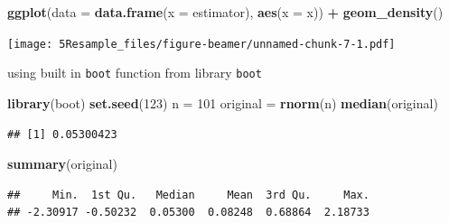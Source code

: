 \documentclass[10pt,ignorenonframetext,]{beamer}
\newenvironment{Shaded}{\begin{snugshade}}{\end{snugshade}}
\newcommand{\KeywordTok}[1]{\textcolor[rgb]{0.13,0.29,0.53}{\textbf{#1}}}
\newcommand{\DataTypeTok}[1]{\textcolor[rgb]{0.13,0.29,0.53}{#1}}
\newcommand{\DecValTok}[1]{\textcolor[rgb]{0.00,0.00,0.81}{#1}}
\newcommand{\StringTok}[1]{\textcolor[rgb]{0.31,0.60,0.02}{#1}}
\newcommand{\OperatorTok}[1]{\textcolor[rgb]{0.81,0.36,0.00}{\textbf{#1}}}
\newcommand{\NormalTok}[1]{#1}
\begin{document}
\begin{frame}[fragile]

\begin{Shaded}
\begin{Highlighting}[]
\KeywordTok{ggplot}\NormalTok{(}\DataTypeTok{data =} \KeywordTok{data.frame}\NormalTok{(}\DataTypeTok{x =}\NormalTok{ estimator), }\KeywordTok{aes}\NormalTok{(}\DataTypeTok{x =}\NormalTok{ x)) }\OperatorTok{+}\StringTok{ }\KeywordTok{geom_density}\NormalTok{()}
\end{Highlighting}
\end{Shaded}

\texttt{[image: 5Resample\_files/figure-beamer/unnamed-chunk-7-1.pdf]}

\end{frame}

\begin{frame}[fragile]

\begin{block}{using built in \texttt{boot} function from library
\texttt{boot}}

\begin{Shaded}
\begin{Highlighting}[]
\KeywordTok{library}\NormalTok{(boot)}
\KeywordTok{set.seed}\NormalTok{(}\DecValTok{123}\NormalTok{)}
\NormalTok{n =}\StringTok{ }\DecValTok{101}
\NormalTok{original =}\StringTok{ }\KeywordTok{rnorm}\NormalTok{(n)}
\KeywordTok{median}\NormalTok{(original)}
\end{Highlighting}
\end{Shaded}

\begin{verbatim}
## [1] 0.05300423
\end{verbatim}

\begin{Shaded}
\begin{Highlighting}[]
\KeywordTok{summary}\NormalTok{(original)}
\end{Highlighting}
\end{Shaded}

\begin{verbatim}
##     Min.  1st Qu.   Median     Mean  3rd Qu.     Max. 
## -2.30917 -0.50232  0.05300  0.08248  0.68864  2.18733
\end{verbatim}

\end{block}

\end{frame}
\end{document}

